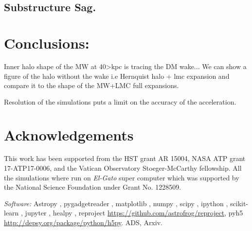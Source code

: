\documentclass[twocolumn]{aastex62}
\begin{document}
\subsection{Substructure Sag.}


\section{Conclusions:}

\item Inner halo shape of the MW at 40>kpc is tracing the DM wake... We can show
  a figure of the halo without the wake i.e Hernquist halo + lmc expansion and
  compare it to the shape of the MW+LMC full expansions.
\item Resolution of the simulations puts a limit on the accuracy of the
  acceleration.  
\section*{Acknowledgements}

This work has been supported from the HST grant AR 15004, NASA ATP grant
17-ATP17-0006, and the Vatican Observatory Stoeger-McCarthy fellowship.
All the simulations where run on \textit{El-Gato} super computer which 
was supported by the National Science Foundation under Grant No. 1228509. 



\textit{Software:} Astropy \citep{astropy:2013, astropy:2018},  pygadgetreader
\cite{pygadgetreader}, matplotlib \cite{Hunter:2007}, numpy \cite{numpy}, scipy \cite{scipy},
ipython \cite{ipython}, scikit-learn \citep{scikit-learn, sklearn_api}, jupyter
\cite{jupyter}, healpy \cite{healpy}, reproject 
\href{https://github.com/astrofrog/reproject}{https://github.com/astrofrog/reproject}, pyh5
\href{http://depsy.org/package/python/h5py}{http://depsy.org/package/python/h5py}.  ADS, Arxiv.



% 








\end{document}

